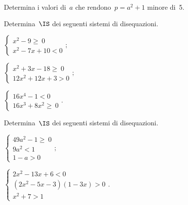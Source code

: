 \begin{esercizio}[\Ast]
 \label{ese:20.51}
 Determina i valori di~$a$ che rendono~$p=a^{2}+1$ minore di~5.
\end{esercizio}

\begin{esercizio}[\Ast]
 \label{ese:20.52}
 Determina~$\IS$ dei seguenti sistemi di disequazioni.
 \begin{multicols}{3}
 \begin{enumeratea}
 \item $\left\{\begin{array}{l}
		x^{2}-9\ge~0\\
		x^{2}-7x+10<0
	   \end{array}\right.;$
\item $\left\{\begin{array}{l}
		x^{2}+3x-18\ge~0\\
		12x^{2}+12x+3>0
	   \end{array}\right.;$
\item $\left\{\begin{array}{l}
		16x^{4}-1<0 \\
		16x^{3}+8x^{2}\ge~0 \end{array}\right.. $
 \end{enumeratea}
 \end{multicols}
\end{esercizio}

\begin{esercizio}[\Ast]
 \label{ese:20.53}
 Determina~$\IS$ dei seguenti sistemi di disequazioni.
 \begin{multicols}{2}
 \begin{enumeratea}
 \item $\left\{\begin{array}{l}
		49a^{2}-1\ge~0\\
		9a^{2}<1\\
		1-a>0
	   \end{array}\right.;$

\item $\left\{\begin{array}{l}
	  2x^{2}-13x+6<0\\
	  (2x^{2}-5x-3)(1-3x)>0\\
	  x^{2}+7>1
	   \end{array}\right..$
 \end{enumeratea}
 \end{multicols}
\end{esercizio}

